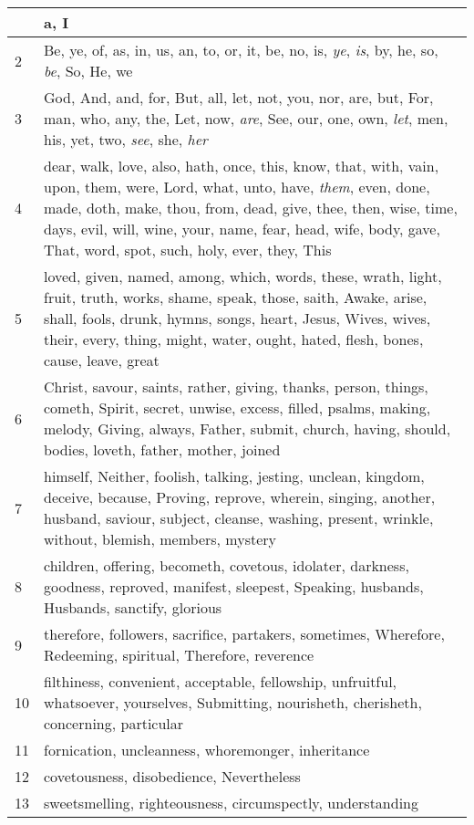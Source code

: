 \begin{center}
\begin{longtable}{l|p{3.75in}}
\hline \hline 
\endlastfoot 
1 & a, I\\ \hline 
2 & Be, ye, of, as, in, us, an, to, or, it, be, no, is, \emph{ye}, \emph{is}, by, he, so, \emph{be}, So, He, we\\ \hline 
3 & God, And, and, for, But, all, let, not, you, nor, are, but, For, man, who, any, the, Let, now, \emph{are}, See, our, one, own, \emph{let}, men, his, yet, two, \emph{see}, she, \emph{her}\\ \hline 
4 & dear, walk, love, also, hath, once, this, know, that, with, vain, upon, them, were, Lord, what, unto, have, \emph{them}, even, done, made, doth, make, thou, from, dead, give, thee, then, wise, time, days, evil, will, wine, your, name, fear, head, wife, body, gave, That, word, spot, such, holy, ever, they, This\\ \hline 
5 & loved, given, named, among, which, words, these, wrath, light, fruit, truth, works, shame, speak, those, saith, Awake, arise, shall, fools, drunk, hymns, songs, heart, Jesus, Wives, wives, their, every, thing, might, water, ought, hated, flesh, bones, cause, leave, great\\ \hline 
6 & Christ, savour, saints, rather, giving, thanks, person, things, cometh, Spirit, secret, unwise, excess, filled, psalms, making, melody, Giving, always, Father, submit, church, having, should, bodies, loveth, father, mother, joined\\ \hline 
7 & himself, Neither, foolish, talking, jesting, unclean, kingdom, deceive, because, Proving, reprove, wherein, singing, another, husband, saviour, subject, cleanse, washing, present, wrinkle, without, blemish, members, mystery\\ \hline 
8 & children, offering, becometh, covetous, idolater, darkness, goodness, reproved, manifest, sleepest, Speaking, husbands, Husbands, sanctify, glorious\\ \hline 
9 & therefore, followers, sacrifice, partakers, sometimes, Wherefore, Redeeming, spiritual, Therefore, reverence\\ \hline 
10 & filthiness, convenient, acceptable, fellowship, unfruitful, whatsoever, yourselves, Submitting, nourisheth, cherisheth, concerning, particular\\ \hline 
11 & fornication, uncleanness, whoremonger, inheritance\\ \hline 
12 & covetousness, disobedience, Nevertheless\\ \hline 
13 & sweetsmelling, righteousness, circumspectly, understanding\\ \hline 
\end{longtable} 
\end{center} 




 
